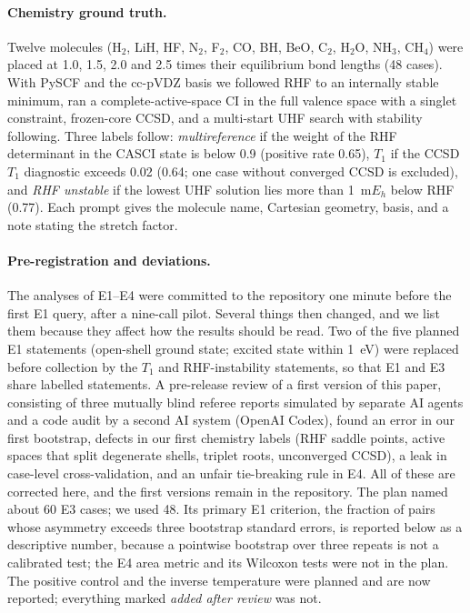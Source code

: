 \documentclass[11pt]{article}
\newcommand{\Eh}{\ensuremath{\mathrm{m}E_h}}
\begin{document}
\paragraph{Chemistry ground truth.}
Twelve molecules (H$_2$, LiH, HF, N$_2$, F$_2$, CO, BH, BeO, C$_2$, H$_2$O, NH$_3$, CH$_4$) were placed at 1.0, 1.5, 2.0 and 2.5 times their equilibrium bond lengths (48 cases).
With PySCF and the cc-pVDZ basis we followed RHF to an internally stable minimum, ran a complete-active-space CI in the full valence space with a singlet constraint, frozen-core CCSD, and a multi-start UHF search with stability following.
Three labels follow: \emph{multireference} if the weight of the RHF determinant in the CASCI state is below 0.9 (positive rate 0.65), \emph{$T_1$} if the CCSD $T_1$ diagnostic \citep{lee1989diagnostic} exceeds 0.02 (0.64; one case without converged CCSD is excluded), and \emph{RHF unstable} if the lowest UHF solution lies more than 1~\Eh{} below RHF (0.77).
Each prompt gives the molecule name, Cartesian geometry, basis, and a note stating the stretch factor.

\paragraph{Pre-registration and deviations.}
The analyses of E1--E4 were committed to the repository one minute before the first E1 query, after a nine-call pilot.
Several things then changed, and we list them because they affect how the results should be read.
Two of the five planned E1 statements (open-shell ground state; excited state within 1~eV) were replaced before collection by the $T_1$ and RHF-instability statements, so that E1 and E3 share labelled statements.
A pre-release review of a first version of this paper, consisting of three mutually blind referee reports simulated by separate AI agents and a code audit by a second AI system (OpenAI Codex), found an error in our first bootstrap, defects in our first chemistry labels (RHF saddle points, active spaces that split degenerate shells, triplet roots, unconverged CCSD), a leak in case-level cross-validation, and an unfair tie-breaking rule in E4.
All of these are corrected here, and the first versions remain in the repository.
The plan named about 60 E3 cases; we used 48. Its primary E1 criterion, the fraction of pairs whose asymmetry exceeds three bootstrap standard errors, is reported below as a descriptive number, because a pointwise bootstrap over three repeats is not a calibrated test; the E4 area metric and its Wilcoxon tests were not in the plan. The positive control and the inverse temperature were planned and are now reported; everything marked \emph{added after review} was not.
\end{document}
